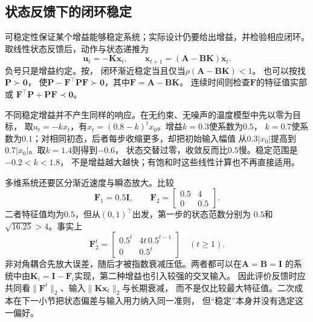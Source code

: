 \subsection{状态反馈下的闭环稳定}
\label{sec:control-state-feedback-stability}
可稳定性保证某个增益能够稳定系统；实际设计仍要给出增益，并检验相应闭环。
取线性状态反馈后，动作与状态递推为
\begin{equation}
  \bm u_t=-\bm K\bm x_t,
  \qquad \bm x_{t+1}=(\bm A-\bm B\bm K)\bm x_t.
  \label{eq:control-state-feedback}
\end{equation}
负号只是增益约定。按，
闭环渐近稳定当且仅当$\rho(\bm A-\bm B\bm K)<1$。
也可以按找$\bm P\succ\bm0$，
使$\bm P-\bm F^\top\bm P\bm F\succ\bm0$，其中$\bm F=\bm A-\bm B\bm K$。
连续时间则检查$\bm F$的特征值实部或
$\bm F^\top\bm P+\bm P\bm F\prec\bm0$。

不同稳定增益并不产生同样的响应。在无约束、无噪声的温度模型中先以零为目标，
取$u_t=-kx_t$，有$x_t=(0.8-k)^t x_0$。增益$k=0.3$使系数为$0.5$，
$k=0.7$使系数为$0.1$；对相同初态，后者每步收缩更多，却把初始输入幅值
从$0.3|x_0|$提高到$0.7|x_0|$。取$k=1.4$则得到$-0.6$，
状态交替过零，收敛反而比$0.5$慢。稳定范围是$-0.2<k<1.8$，
不是增益越大越快；有饱和时这些线性计算也不再直接适用。

多维系统还要区分渐近速度与瞬态放大。比较
\[
  \bm F_1=0.5\bm I,\qquad
  \bm F_2=\begin{bmatrix}0.5&4\\0&0.5\end{bmatrix}.
\]
二者特征值均为$0.5$，但从$(0,1)^\top$出发，第一步的状态范数分别为
$0.5$和$\sqrt{16.25}>4$。事实上
\[
  \bm F_2^t=
  \begin{bmatrix}0.5^t&4t\,0.5^{t-1}\\0&0.5^t\end{bmatrix}
  \quad(t\geq1).
\]
非对角耦合先放大误差，随后才被指数衰减压低。两者都可以在$\bm A=\bm B=\bm I$
的系统中由$\bm K_i=\bm I-\bm F_i$实现，第二种增益也引入较强的交叉输入。
因此评价反馈时应共同看$\|\bm F^t\|_2$、输入$\|\bm K\bm x_t\|_2$与长期衰减，
而不是仅比较最大特征值。二次成本在下一小节把状态偏差与输入用力纳入同一准则，
但“稳定”本身并没有选定这一偏好。

